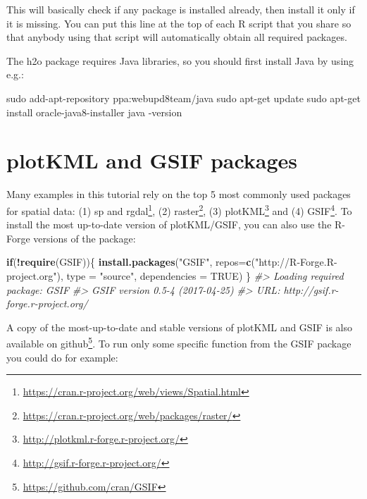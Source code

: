 \documentclass[graybox,natbib,nospthms,UStrade]{svmono}
\newenvironment{Shaded}{\begin{snugshade}}{\end{snugshade}}
\newcommand{\CommentTok}[1]{\textcolor[rgb]{0.37,0.37,0.37}{\textit{#1}}}
\newcommand{\ControlFlowTok}[1]{\textcolor[rgb]{0.27,0.27,0.27}{\textbf{#1}}}
\newcommand{\DataTypeTok}[1]{\textcolor[rgb]{0.27,0.27,0.27}{#1}}
\newcommand{\ExtensionTok}[1]{#1}
\newcommand{\FunctionTok}[1]{\textcolor[rgb]{0,0,0}{#1}}
\newcommand{\KeywordTok}[1]{\textcolor[rgb]{0.27,0.27,0.27}{\textbf{#1}}}
\newcommand{\NormalTok}[1]{#1}
\newcommand{\OperatorTok}[1]{\textcolor[rgb]{0.43,0.43,0.43}{\textbf{#1}}}
\newcommand{\OtherTok}[1]{\textcolor[rgb]{0.37,0.37,0.37}{#1}}
\newcommand{\StringTok}[1]{\textcolor[rgb]{0.5,0.5,0.5}{#1}}
\renewcommand{\href}[2]{#2 (\url{#1})}
\renewcommand{\href}[2]{#2\footnote{\url{#1}}}
\begin{document}
This will basically check if any package is installed already, then install it only if it is missing. You can put this line at the top of each R script that you share so that anybody using that script will automatically obtain all required packages.

The h2o package requires Java libraries, so you should first install Java by using e.g.:

\begin{Shaded}
\begin{Highlighting}[]
\FunctionTok{sudo}\NormalTok{ add-apt-repository ppa:webupd8team/java}
\FunctionTok{sudo}\NormalTok{ apt-get update}
\FunctionTok{sudo}\NormalTok{ apt-get install oracle-java8-installer}
\ExtensionTok{java}\NormalTok{ -version}
\end{Highlighting}
\end{Shaded}

\hypertarget{plotkml-and-gsif-packages}{%
\section{plotKML and GSIF packages}\label{plotkml-and-gsif-packages}}

Many examples in this tutorial rely on the top 5 most commonly used packages for spatial data: (1) \href{https://cran.r-project.org/web/views/Spatial.html}{sp and rgdal}, (2) \href{https://cran.r-project.org/web/packages/raster/}{raster}, (3) \href{http://plotkml.r-forge.r-project.org/}{plotKML} and (4) \href{http://gsif.r-forge.r-project.org/}{GSIF}. To install the most up-to-date version of plotKML/GSIF, you can also use the R-Forge versions of the package:

\begin{Shaded}
\begin{Highlighting}[]
\ControlFlowTok{if}\NormalTok{(}\OperatorTok{!}\KeywordTok{require}\NormalTok{(GSIF))\{}
  \KeywordTok{install.packages}\NormalTok{(}\StringTok{"GSIF"}\NormalTok{, }\DataTypeTok{repos=}\KeywordTok{c}\NormalTok{(}\StringTok{"http://R-Forge.R-project.org"}\NormalTok{), }
                 \DataTypeTok{type =} \StringTok{"source"}\NormalTok{, }\DataTypeTok{dependencies =} \OtherTok{TRUE}\NormalTok{)}
\NormalTok{\}}
\CommentTok{#> Loading required package: GSIF}
\CommentTok{#> GSIF version 0.5-4 (2017-04-25)}
\CommentTok{#> URL: http://gsif.r-forge.r-project.org/}
\end{Highlighting}
\end{Shaded}

A copy of the most-up-to-date and stable versions of plotKML and GSIF is also available on \href{https://github.com/cran/GSIF}{github}. To run only some specific function from the GSIF package you could do for example:
\end{document}
